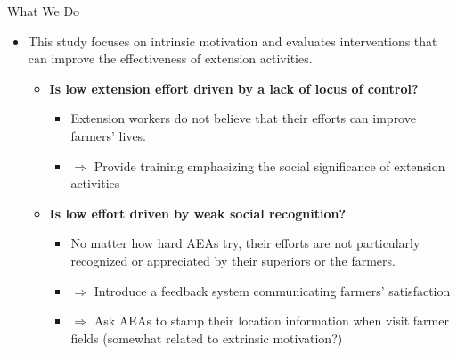 \documentclass[aspectratio=169]{beamer}
\begin{document}
\begin{frame}{What We Do}
	
	\begin{itemize}
		\item This study focuses on intrinsic motivation and evaluates interventions
		that can improve the effectiveness of extension activities.
		
		\vspace{0.3cm}
		\begin{itemize}
			\item \textbf{Is low extension effort driven by a lack of locus of control?}
			\begin{itemize}
				\item Extension workers do not believe that their efforts can improve farmers' lives.
				\item $\Rightarrow$ Provide training emphasizing the social significance of extension activities
			\end{itemize}
			
			\vspace{0.3cm}
			
			\item \textbf{Is low effort driven by weak social recognition?}
			\begin{itemize}
				\item  No matter how hard AEAs try, their efforts are not particularly recognized or appreciated by their superiors or the farmers. 
				\item $\Rightarrow$ Introduce a feedback system communicating farmers' satisfaction
				\item $\Rightarrow$ Ask AEAs to stamp their location information when visit farmer fields (somewhat related to extrinsic motivation?)
			\end{itemize}
			
			\vspace{0.3cm}
			
			
		\end{itemize}
	\end{itemize}
	
\end{frame}
\end{document}
